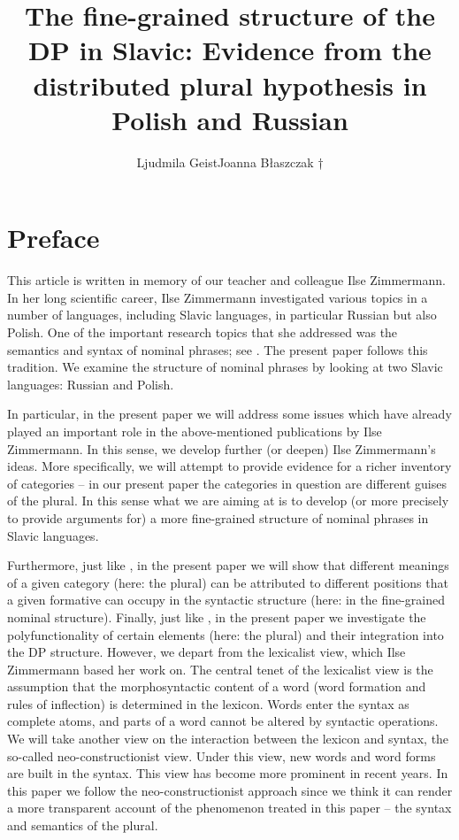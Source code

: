 \documentclass[output=paper,colorlinks,citecolor=brown,
]{langscibook}
\author{Ljudmila Geist\affiliation{University of Stuttgart}\orcid{0000-0001-7907-4958}\lastand Joanna Błaszczak †\affiliation{University of Wrocław}\orcid{0000-0002-8332-2827}}
\title{The fine-grained structure of the DP in Slavic: Evidence from the distributed plural hypothesis in Polish and Russian}
\begin{document}
\maketitle


\section*{Preface}
This article is written in memory of our teacher and colleague Ilse Zimmermann. In her long scientific career, Ilse Zimmermann investigated various topics in a number of languages, including Slavic languages, in particular Russian but also Polish. One of the important research topics that she addressed was the semantics and syntax of nominal phrases; see \citet{Zimmermann1983,Zimmermann1988,Zimmermann1991,Zimmermann2008}. The present paper follows this tradition. We examine the structure of nominal phrases by looking at two Slavic languages: Russian and Polish.

In particular, in the present paper we will address some issues which have already played an important role in the above-mentioned publications by Ilse Zimmermann. In this sense, we develop further (or deepen) Ilse Zimmermann's ideas. More specifically, we will attempt to provide evidence for a richer inventory of categories -- in our present paper the categories in question are different guises of the plural. In this sense what we are aiming at is to develop (or more precisely to provide arguments for) a more fine-grained structure of nominal phrases in Slavic languages.

Furthermore, just like \citet{Zimmermann1988}, in the present paper we will show that different meanings of a given category (here: the plural) can be attributed to different positions that a given formative can occupy in the syntactic structure (here: in the fine-grained nominal structure).
Finally, just like \citet{Zimmermann2008}, in the present paper we investigate the polyfunctionality of certain elements (here: the plural) and their integration into the DP structure. However, we depart from the lexicalist view, which Ilse Zimmermann based her work on. The central tenet of the lexicalist view is the assumption that the morphosyntactic content of a word (word formation and rules of inflection) is determined in the lexicon. Words enter the syntax as complete atoms, and parts of a word cannot be altered by syntactic operations. We will take another view on the interaction between the lexicon and syntax, the so-called neo-constructionist view. Under this view, new words and word forms are built in the syntax. This view has become more prominent in recent years. In this paper we follow the neo-constructionist approach since we think it can render a more transparent account of the phenomenon treated in this paper -- the syntax and semantics of the plural. 
\end{document}
